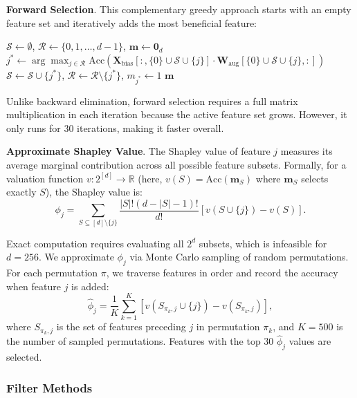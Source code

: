 \documentclass[onecolumn,a4paper,12pt]{IEEEtran}
\begin{document}
\textbf{Forward Selection}. This complementary greedy approach starts with an empty feature set and iteratively adds the most beneficial feature:
\begin{algorithm}[htbp]
\caption{Forward Selection}
\label{alg:forward}
\begin{algorithmic}[1]
\State $\mathcal{S} \leftarrow \emptyset$, $\mathcal{R} \leftarrow \{0, 1, \dots, d-1\}$, $\mathbf{m} \leftarrow \mathbf{0}_d$
    \State $j^* \leftarrow \arg\max_{j \in \mathcal{R}} \text{Acc}(\mathbf{X}_{\text{bias}}[:, \{0\} \cup \mathcal{S} \cup \{j\}] \cdot \mathbf{W}_{\text{aug}}[\{0\} \cup \mathcal{S} \cup \{j\}, :])$
    \State $\mathcal{S} \leftarrow \mathcal{S} \cup \{j^*\}$, $\mathcal{R} \leftarrow \mathcal{R} \setminus \{j^*\}$, $m_{j^*} \leftarrow 1$
\EndWhile
\State \Return $\mathbf{m}$
\end{algorithmic}
\end{algorithm}

Unlike backward elimination, forward selection requires a full matrix multiplication in each iteration because the active feature set grows. However, it only runs for 30 iterations, making it faster overall.

\textbf{Approximate Shapley Value}. The Shapley value of feature $j$ measures its average marginal contribution across all possible feature subsets. Formally, for a valuation function $v: 2^{[d]} \rightarrow \mathbb{R}$ (here, $v(S) = \text{Acc}(\mathbf{m}_S)$ where $\mathbf{m}_S$ selects exactly $S$), the Shapley value is:
\begin{equation}
\phi_j = \sum_{S \subseteq [d] \setminus \{j\}} \frac{|S|! (d - |S| - 1)!}{d!} \left[v(S \cup \{j\}) - v(S)\right].
\end{equation}

Exact computation requires evaluating all $2^d$ subsets, which is infeasible for $d=256$. We approximate $\phi_j$ via Monte Carlo sampling of random permutations. For each permutation $\pi$, we traverse features in order and record the accuracy when feature $j$ is added:
\begin{equation}
\hat{\phi}_j = \frac{1}{K} \sum_{k=1}^{K} \left[v(S_{\pi_k, j} \cup \{j\}) - v(S_{\pi_k, j})\right],
\end{equation}
where $S_{\pi_k, j}$ is the set of features preceding $j$ in permutation $\pi_k$, and $K=500$ is the number of sampled permutations. Features with the top 30 $\hat{\phi}_j$ values are selected.

\subsubsection{Filter Methods}
\end{document}
